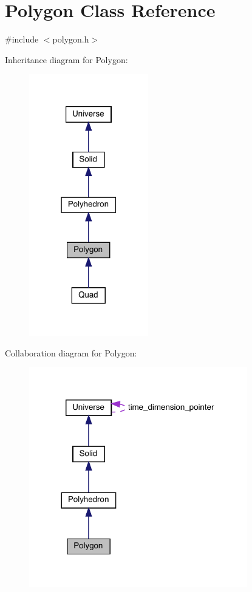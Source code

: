 \hypertarget{class_polygon}{}\section{Polygon Class Reference}
\label{class_polygon}


{\ttfamily \#include $<$polygon.\+h$>$}



Inheritance diagram for Polygon\+:\nopagebreak
\begin{figure}[H]
\begin{center}
\leavevmode
\includegraphics[width=147pt]{class_polygon__inherit__graph}
\end{center}
\end{figure}


Collaboration diagram for Polygon\+:\nopagebreak
\begin{figure}[H]
\begin{center}
\leavevmode
\includegraphics[width=269pt]{class_polygon__coll__graph}
\end{center}
\end{figure}
